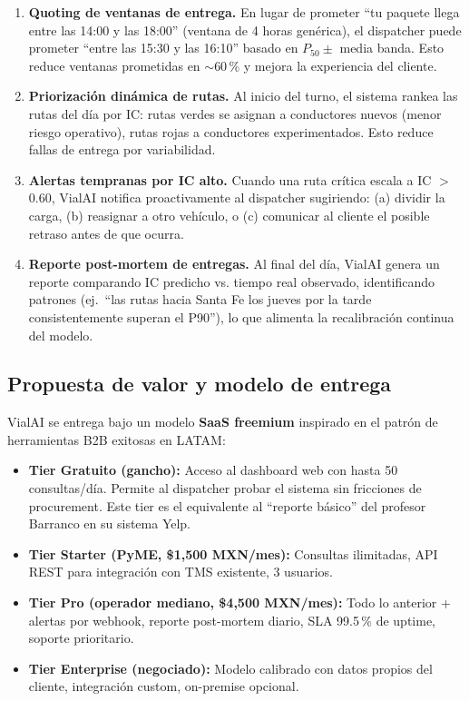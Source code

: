 \documentclass[11pt,a4paper]{article}
\begin{document}
\begin{enumerate}[leftmargin=*]
\item \textbf{Quoting de ventanas de entrega.} En lugar de prometer ``tu paquete llega entre las 14:00 y las 18:00'' (ventana de 4 horas genérica), el dispatcher puede prometer ``entre las 15:30 y las 16:10'' basado en $P_{50} \pm$ media banda. Esto reduce ventanas prometidas en $\sim$60\,\% y mejora la experiencia del cliente.

\item \textbf{Priorización dinámica de rutas.} Al inicio del turno, el sistema rankea las rutas del día por IC: rutas verdes se asignan a conductores nuevos (menor riesgo operativo), rutas rojas a conductores experimentados. Esto reduce fallas de entrega por variabilidad.

\item \textbf{Alertas tempranas por IC alto.} Cuando una ruta crítica escala a IC $>$ 0.60, VialAI notifica proactivamente al dispatcher sugiriendo: (a) dividir la carga, (b) reasignar a otro vehículo, o (c) comunicar al cliente el posible retraso antes de que ocurra.

\item \textbf{Reporte post-mortem de entregas.} Al final del día, VialAI genera un reporte comparando IC predicho vs. tiempo real observado, identificando patrones (ej.\ ``las rutas hacia Santa Fe los jueves por la tarde consistentemente superan el P90''), lo que alimenta la recalibración continua del modelo.
\end{enumerate}

\subsection{Propuesta de valor y modelo de entrega}

VialAI se entrega bajo un modelo \textbf{SaaS freemium} inspirado en el patrón de herramientas B2B exitosas en LATAM:

\begin{itemize}[leftmargin=*]
\item \textbf{Tier Gratuito (gancho):} Acceso al dashboard web con hasta 50 consultas/día. Permite al dispatcher probar el sistema sin fricciones de procurement. Este tier es el equivalente al ``reporte básico'' del profesor Barranco en su sistema Yelp.
\item \textbf{Tier Starter (PyME, \$1{,}500 MXN/mes):} Consultas ilimitadas, API REST para integración con TMS existente, 3 usuarios.
\item \textbf{Tier Pro (operador mediano, \$4{,}500 MXN/mes):} Todo lo anterior + alertas por webhook, reporte post-mortem diario, SLA 99.5\,\% de uptime, soporte prioritario.
\item \textbf{Tier Enterprise (negociado):} Modelo calibrado con datos propios del cliente, integración custom, on-premise opcional.
\end{itemize}
\end{document}
